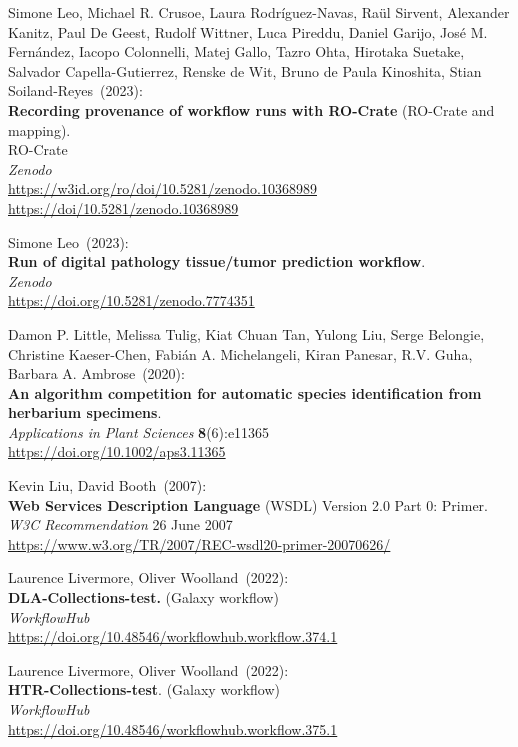 \begin{thebibliography}{9}
Simone Leo, Michael R. Crusoe, Laura Rodríguez-Navas, Raül Sirvent, Alexander Kanitz, Paul De Geest, Rudolf Wittner, Luca Pireddu, Daniel Garijo, José M. Fernández, Iacopo Colonnelli, Matej Gallo, Tazro Ohta, Hirotaka Suetake, Salvador Capella-Gutierrez, Renske de Wit, Bruno de Paula Kinoshita, Stian Soiland-Reyes~(2023): \\
\textbf{Recording provenance of workflow runs with RO-Crate} (RO-Crate and mapping).\\
RO-Crate\\
\emph{Zenodo}\\
\url{https://w3id.org/ro/doi/10.5281/zenodo.10368989}\\
\url{https://doi/10.5281/zenodo.10368989}

Simone Leo~(2023): \\
\textbf{Run of digital pathology tissue/tumor prediction workflow}.\\
\emph{Zenodo}\\
\url{https://doi.org/10.5281/zenodo.7774351}

Damon P. Little, Melissa Tulig, Kiat Chuan Tan, Yulong Liu, Serge Belongie, Christine Kaeser‐Chen, Fabián A. Michelangeli, Kiran Panesar, R.V. Guha, Barbara A. Ambrose~(2020): \\
\textbf{An algorithm competition for automatic species identification from herbarium specimens}.\\
\emph{Applications in Plant Sciences} \textbf{8}(6):e11365\\
\url{https://doi.org/10.1002/aps3.11365}

Kevin Liu, David Booth~(2007): \\
\textbf{Web Services Description Language} (WSDL) Version 2.0
Part 0: Primer. \\
\emph{W3C Recommendation} 26 June 2007 \\
\url{https://www.w3.org/TR/2007/REC-wsdl20-primer-20070626/}

Laurence Livermore, Oliver Woolland~(2022): \\
\textbf{DLA-Collections-test.} (Galaxy workflow)\\
\emph{WorkflowHub}\\
\url{https://doi.org/10.48546/workflowhub.workflow.374.1}

Laurence Livermore, Oliver Woolland~(2022): \\
\textbf{HTR-Collections-test}. (Galaxy workflow)\\
\emph{WorkflowHub}\\
\url{https://doi.org/10.48546/workflowhub.workflow.375.1}


\end{thebibliography}
